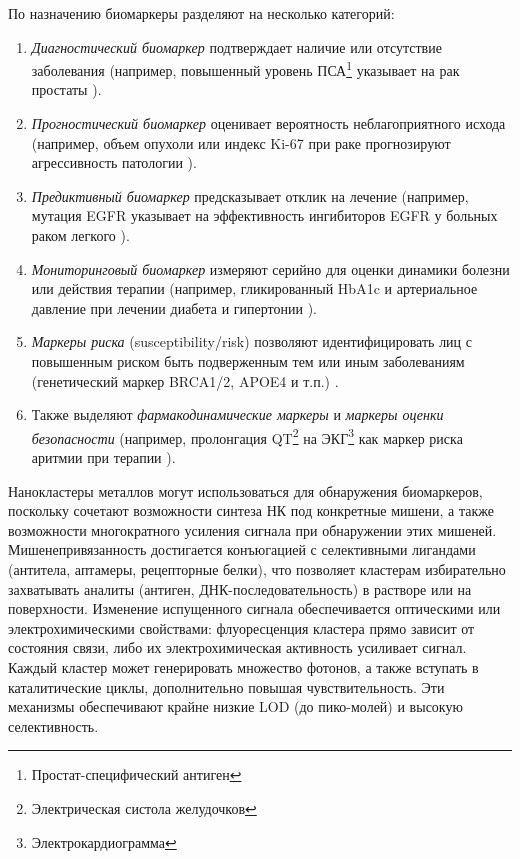 \documentclass[a4paper,12pt]{article}
\begin{document}
\begin{onehalfspace}
	По назначению биомаркеры разделяют на несколько категорий: 
	\begin{enumerate}
		\item \textit{Диагностический биомаркер} подтверждает наличие или отсутствие заболевания (например, повышенный уровень ПСА\footnote{Простат-специфический антиген} указывает на рак простаты \cite{Biomarkers}). 
		\item \textit{Прогностический биомаркер} оценивает вероятность неблагоприятного исхода (например, объем опухоли или индекс Ki-67 при раке прогнозируют агрессивность патологии \cite{Biomarkers2}). 
		\item \textit{Предиктивный биомаркер} предсказывает отклик на лечение (например, мутация EGFR указывает на эффективность ингибиторов EGFR у больных раком легкого  \cite{Biomarkers2}). 
		\item \textit{Мониторинговый биомаркер} измеряют серийно для оценки динамики болезни или действия терапии (например, гликированный HbA1c и артериальное давление при лечении диабета и гипертонии \cite{Califf2018}). 
		\item \textit{Маркеры риска} (susceptibility/risk) позволяют идентифицировать лиц с повышенным риском быть подверженным тем или иным заболеваниям (генетический маркер BRCA1/2, APOE4 и т.п.) \cite{Califf2018}. 
		\item Также выделяют \textit{фармакодинамические маркеры} и \textit{маркеры оценки безопасности} (например, пролонгация QT\footnote{Электрическая систола желудочков} на ЭКГ\footnote{Электрокардиограмма} как маркер риска аритмии при терапии \cite{Califf2018}).
	\end{enumerate}
	
	Нанокластеры металлов могут использоваться для обнаружения биомаркеров, поскольку сочетают возможности синтеза НК под конкретные мишени, а также возможности многократного усиления сигнала при обнаружении этих мишеней. Мишенепривязанность достигается конъюгацией с селективными лигандами (антитела, аптамеры, рецепторные белки), что позволяет кластерам избирательно захватывать аналиты (антиген, ДНК-последовательность) в растворе или на поверхности. Изменение испущенного сигнала обеспечивается оптическими или электрохимическими свойствами: флуоресценция кластера прямо зависит от состояния связи, либо их электрохимическая активность усиливает сигнал. Каждый кластер может генерировать множество фотонов, а также вступать в каталитические циклы, дополнительно повышая чувствительность. Эти механизмы обеспечивают крайне низкие LOD (до пико-молей) и высокую селективность.
	

\end{onehalfspace}
\end{document}
